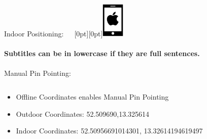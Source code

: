 \documentclass[11pt]{beamer}
\begin{document}
\begin{frame}{Indoor Positioning:~~~\raisebox{-10pt}[0pt][0pt]{\includegraphics[width=0.08\textwidth]{tech-stack-apple}}}

\framesubtitle{Subtitles can be in lowercase if they are full sentences.}
Manual Pin Pointing:

  \begin{columns}[T]
  \begin{column}{.6\textwidth}
  \begin{itemize}
 \item Offline Coordinates enables Manual Pin Pointing
 \item Outdoor Coordinates: 52.509690,13.325614
 \item Indoor Coordinates: 52.50956691014301, 13.32614194619497


\end{itemize}
\end{column}
\end{columns}
\end{frame}
\end{document}
